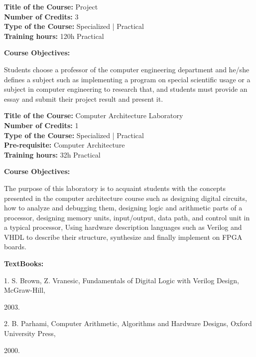 \documentclass[12pt,a4paper]{article}
\begin{document}
\newpage
\nopagebreak
\textbf{Title of the Course:} Project\\
\textbf{Number of Credits:} 3\\
\textbf{Type of the Course:} Specialized | Practical\\
\textbf{Training hours:} 120h Practical\par\vspace{4pt}
\textbf{Course Objectives:}\par\vspace{2pt}
Students choose a professor of the computer engineering department and he/she defines a subject
such as implementing a program on special scientific usage or a subject in computer engineering
to research that, and students must provide an essay and submit their project result and present it.\par\vspace{4pt}

\newpage
\textbf{Title of the Course:} Computer Architecture Laboratory\\
\textbf{Number of Credits:} 1\\
\textbf{Type of the Course:} Specialized | Practical\\
\textbf{Pre-requisite:} Computer Architecture\\
\textbf{Training hours:} 32h Practical\par\vspace{4pt}
\textbf{Course Objectives:}\par\vspace{2pt}
The purpose of this laboratory is to acquaint students with the concepts presented in the computer
architecture course such as designing digital circuits, how to analyze and debugging them,
designing logic and arithmetic parts of a processor, designing memory units, input/output, data
path, and control unit in a typical processor, Using hardware description languages such as Verilog
and VHDL to describe their structure, synthesize and finally implement on FPGA boards.\par\vspace{4pt}
\textbf{TextBooks:}\par\vspace{2pt}
1. S. Brown, Z. Vranesic, Fundamentals of Digital Logic with Verilog Design, McGraw-Hill,\par
2003.\par
2. B. Parhami, Computer Arithmetic, Algorithms and Hardware Designs, Oxford University Press,\par
2000.\par
\vspace{4pt}
\end{document}
